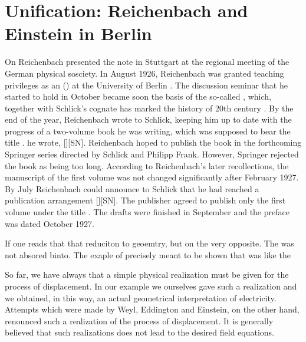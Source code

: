 \documentclass[draft]{article}
\newcommand{\Reich}{Reichenbach\xspace}
\begin{document}
\section{Unification: Reichenbach and Einstein in Berlin}
\label{unification}
On  Reichenbach presented the note in Stuttgart at the regional meeting of the German physical sosciety. In August 1926, Reichenbach was granted teaching privileges as an  () at the University of Berlin \citep{Hecht1982}. The discussion seminar that he started to hold in October became soon the basis of the so-called , which, together with Schlick's cognate  has marked the history of 20th century  . By the end of the year, Reichenbach wrote to Schlick, keeping him up to date with the progress of a two-volume book he was writing, which was supposed to bear the title .  he wrote,  [][SN]\label{RZL1926}. Reichenbach hoped to publish the book in the forthcoming Springer series  directed by Schlick and Philipp Frank. However, Springer rejected the book as being too long. According to \Reich's later recollections, the manuscript of the first volume was not changed significantly after February 1927. By July Reichenbach could announce to Schlick that he had reached a publication arrangement [][SN]. The publisher agreed to publish only the first volume under the title . The drafts were finished in September and the preface was dated October 1927. 

If one reads that that reduciton to geoemtry, but on the very opposite. The was not absored binto. The exaple of precisely meant to be shown that was like the 

So far, we have always that a simple physical realization must be given for the process of displacement. In our example we ourselves gave such a realization and we obtained, in this way, an actual geometrical interpretation of electricity. Attempts which were made by Weyl, Eddington and Einstein, on the other hand, renounced such a realization of the process of displacement. It is generally believed that such  realizations does not lead to the desired field equations. 
\end{document}
